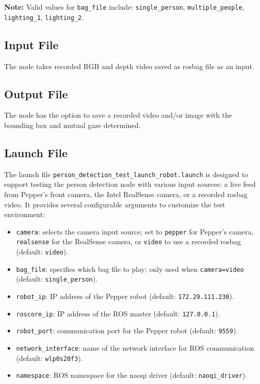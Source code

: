 \documentclass{CSSRforAfrica}
\begin{document}
\noindent \textbf{Note:} Valid values for \texttt{bag\_file} include:  
\texttt{single\_person}, \texttt{multiple\_people}, \texttt{lighting\_1}, \texttt{lighting\_2}.

\subsection*{Input File}
The node takes recorded RGB and depth video saved as rosbag file as an input. 

\subsection*{Output File}
The node has the option to save a recorded video and/or image with the bounding box and mutual gaze determined.

\subsection*{Launch File}
The launch file \texttt{person\_detection\_test\_launch\_robot.launch} is designed to support testing the person detection node with various input sources: a live feed from Pepper’s front camera, the Intel RealSense camera, or a recorded rosbag video. It provides several configurable arguments to customize the test environment:

\begin{itemize}
	\setlength\itemsep{0em}
	\item \texttt{camera}: selects the camera input source; set to \texttt{pepper} for Pepper's camera, \texttt{realsense} for the RealSense camera, or \texttt{video} to use a recorded rosbag (default: \texttt{video}).
	\item \texttt{bag\_file}: specifies which bag file to play; only used when \texttt{camera=video} \\
	 (default: \texttt{single\_person}).
	\item \texttt{robot\_ip}: IP address of the Pepper robot (default: \texttt{172.29.111.230}).
	\item \texttt{roscore\_ip}: IP address of the ROS master (default: \texttt{127.0.0.1}).
	\item \texttt{robot\_port}: communication port for the Pepper robot (default: \texttt{9559}).
	\item \texttt{network\_interface}: name of the network interface for ROS communication (default: \texttt{wlp0s20f3}).
	\item \texttt{namespace}: ROS namespace for the naoqi driver (default: \texttt{naoqi\_driver}).
\end{itemize}
\end{document}

